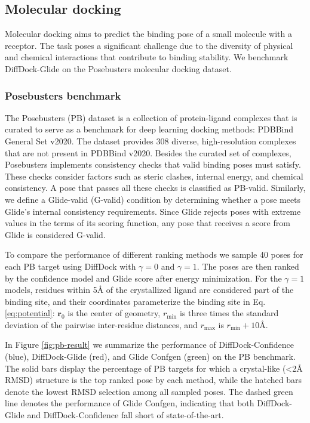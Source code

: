 \documentclass[letterpaper]{article}
\newcommand{\lh}[1]{{\color{blue}{#1}}}
\begin{document}
\subsection{Molecular docking}\label{sec:molecular-docking}
Molecular docking aims to predict the binding pose of a small molecule with a receptor. The task poses a significant challenge due to the diversity of physical and chemical interactions that contribute to binding stability. We benchmark DiffDock-Glide on the Posebusters molecular docking dataset.\cite{buttenschoen2024posebusters}

\subsubsection{Posebusters benchmark}
The Posebusters (PB) dataset is a collection of protein-ligand complexes that is curated to serve as a benchmark for deep learning docking methods: PDBBind General Set v2020.\cite{buttenschoen2024posebusters} The dataset provides 308 diverse, high-resolution complexes that are not present in PDBBind v2020. Besides the curated set of complexes, Posebusters implements consistency checks that valid binding poses must satisfy. These checks consider factors such as steric clashes, internal energy, and chemical consistency. A pose that passes all these checks is classified as PB-valid. Similarly, we define a Glide-valid (G-valid) condition by determining whether a pose meets Glide’s internal consistency requirements. Since Glide rejects poses with extreme values in the terms of its scoring function, any pose that receives a score from Glide is considered G-valid.

To compare the performance of different ranking methods we sample 40 poses for each PB target using DiffDock with $\gamma=0$ and $\gamma=1$. The poses are then ranked by the confidence model and Glide score after energy minimization. For the $\gamma=1$ models, residues within 5{\AA} of the crystallized ligand are considered part of the binding site, and their coordinates parameterize the binding site in Eq. \ref{eq:potential}: $\mathbf{r}_0$ is the center of geometry, $r_\mathrm{min}$ is three times the standard deviation of the pairwise inter-residue distances, and $r_\mathrm{max}$ is $r_\mathrm{min} + 10${\AA}.

In Figure \ref{fig:pb-result} we summarize the performance of DiffDock-Confidence (blue), DiffDock-Glide (red), and Glide Confgen (green) on the PB benchmark. \lh {Glide Confgen evaluates Glide SP docking on conformers initialized by Confgen, while the refinement step of DiffDock-Glide uses Glide's post-docking minimization pipeline rather than a full docking search. In all cases, Glide is run with default parameters.} The solid bars display the percentage of PB targets for which a crystal-like (<2{\AA} RMSD) structure is the top ranked pose by each method, while the hatched bars denote the lowest RMSD selection among all sampled poses. The dashed green line denotes the performance of Glide Confgen, indicating that both DiffDock-Glide and DiffDock-Confidence fall short of state-of-the-art.
\end{document}
